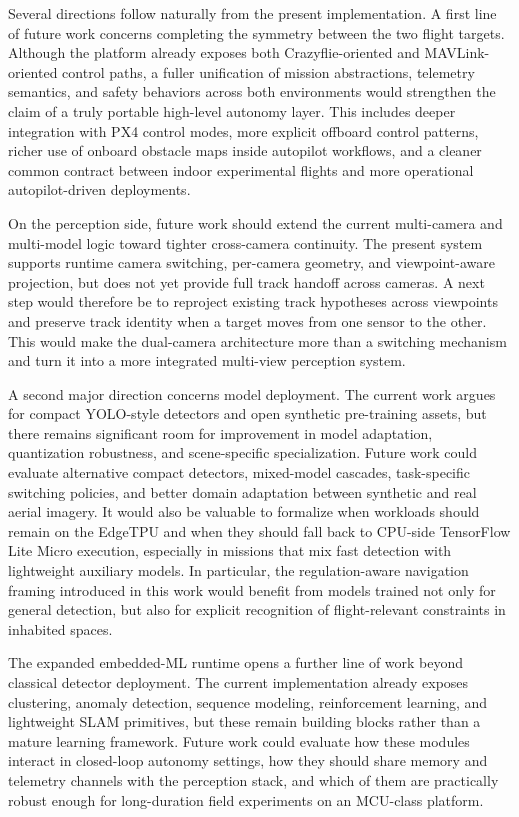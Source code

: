 Several directions follow naturally from the present implementation. A
first line of future work concerns completing the symmetry between the
two flight targets. Although the platform already exposes both
Crazyflie-oriented and MAVLink-oriented control paths, a fuller
unification of mission abstractions, telemetry semantics, and safety
behaviors across both environments would strengthen the claim of a truly
portable high-level autonomy layer. This includes deeper integration
with PX4 control modes, more explicit offboard control patterns, richer
use of onboard obstacle maps inside autopilot workflows, and a cleaner
common contract between indoor experimental flights and more operational
autopilot-driven deployments.

On the perception side, future work should extend the current
multi-camera and multi-model logic toward tighter cross-camera
continuity. The present system supports runtime camera switching,
per-camera geometry, and viewpoint-aware projection, but does not yet
provide full track handoff across cameras. A next step would therefore
be to reproject existing track hypotheses across viewpoints and preserve
track identity when a target moves from one sensor to the other. This
would make the dual-camera architecture more than a switching mechanism
and turn it into a more integrated multi-view perception system.

A second major direction concerns model deployment. The current work
argues for compact YOLO-style detectors and open synthetic pre-training
assets, but there remains significant room for improvement in model
adaptation, quantization robustness, and scene-specific specialization.
Future work could evaluate alternative compact detectors, mixed-model
cascades, task-specific switching policies, and better domain adaptation
between synthetic and real aerial imagery. It would also be valuable to
formalize when workloads should remain on the EdgeTPU and when they
should fall back to CPU-side TensorFlow Lite Micro execution, especially
in missions that mix fast detection with lightweight auxiliary models.
In particular, the regulation-aware navigation framing introduced in
this work would benefit from models trained not only for general
detection, but also for explicit recognition of flight-relevant
constraints in inhabited spaces.

The expanded embedded-ML runtime opens a further line of work beyond
classical detector deployment. The current implementation already
exposes clustering, anomaly detection, sequence modeling, reinforcement
learning, and lightweight SLAM primitives, but these remain building
blocks rather than a mature learning framework. Future work could
evaluate how these modules interact in closed-loop autonomy settings,
how they should share memory and telemetry channels with the perception
stack, and which of them are practically robust enough for long-duration
field experiments on an MCU-class platform.

